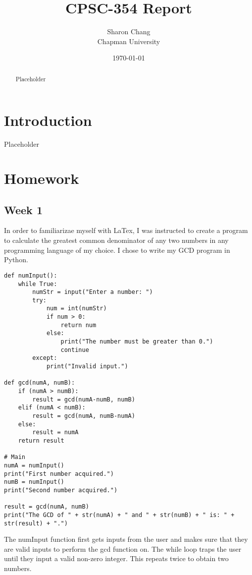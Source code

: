 \documentclass{article}
\title{CPSC-354 Report}
\author{Sharon Chang  \\ Chapman University}
\date{\today}
\theoremstyle{theorem}
\theoremstyle{definition}
\theoremstyle{remark}
\begin{document}
\maketitle

\begin{abstract}
Placeholder  
\end{abstract}

\tableofcontents

\section{Introduction}\label{intro}

Placeholder

\section{Homework}\label{homework}


\subsection{Week 1}

In order to familiarizae myself with LaTex, I was instructed to create a program to calculate the greatest common denominator of any two numbers in any programming language of my choice. I chose to write my GCD program in Python.

\begin{lstlisting}
def numInput():
    while True:
        numStr = input("Enter a number: ")
        try:
            num = int(numStr)
            if num > 0:
                return num
            else:
                print("The number must be greater than 0.")
                continue
        except:
            print("Invalid input.")

def gcd(numA, numB):
    if (numA > numB):
        result = gcd(numA-numB, numB)
    elif (numA < numB):
        result = gcd(numA, numB-numA)
    else:
        result = numA
    return result

# Main
numA = numInput()
print("First number acquired.")
numB = numInput()
print("Second number acquired.")

result = gcd(numA, numB)
print("The GCD of " + str(numA) + " and " + str(numB) + " is: " + str(result) + ".")
\end{lstlisting}
%
The numInput function first gets inputs from the user and makes sure that they are valid inputs to perform the gcd function on. The while loop traps the user until they input a valid non-zero integer. This repeats twice to obtain two numbers.
\end{document}
